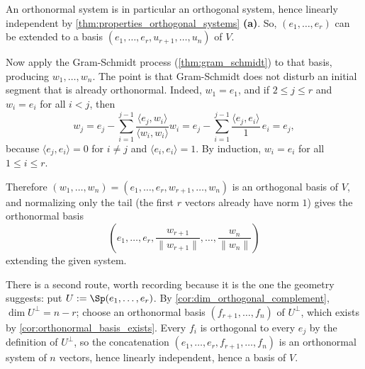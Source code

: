 \begin{exercisesolution}
\label{sol:extend_orthonormal_system}
  An orthonormal system is in particular an orthogonal system, hence linearly independent by \cref{thm:properties_orthogonal_systems} \textbf{(a)}. So, $(e_1, \dots, e_r)$ can be extended to a basis $(e_1, \dots, e_r, u_{r+1}, \dots, u_n)$ of $V$.

  Now apply the Gram-Schmidt process (\cref{thm:gram_schmidt}) to that basis, producing $w_1, \dots, w_n$. The point is that Gram-Schmidt does not disturb an initial segment that is already orthonormal. Indeed, $w_1 = e_1$, and if $2 \le j \le r$ and $w_i = e_i$ for all $i < j$, then
  \[ w_j = e_j - \sum_{i=1}^{j-1} \frac{\langle e_j, w_i \rangle}{\langle w_i, w_i \rangle} w_i = e_j - \sum_{i=1}^{j-1} \frac{\langle e_j, e_i \rangle}{1} \, e_i = e_j, \]
  because $\langle e_j, e_i \rangle = 0$ for $i \ne j$ and $\langle e_i, e_i \rangle = 1$. By induction, $w_i = e_i$ for all $1 \le i \le r$.

  Therefore $(w_1, \dots, w_n) = (e_1, \dots, e_r, w_{r+1}, \dots, w_n)$ is an orthogonal basis of $V$, and normalizing only the tail (the first $r$ vectors already have norm $1$) gives the orthonormal basis
  \[ \left( e_1, \dots, e_r, \frac{w_{r+1}}{\|w_{r+1}\|}, \dots, \frac{w_n}{\|w_n\|} \right) \]
  extending the given system.

  There is a second route, worth recording because it is the one the geometry suggests: put $U := \Sp(e_1, \dots, e_r)$. By \cref{cor:dim_orthogonal_complement}, $\dim U^\perp = n - r$; choose an orthonormal basis $(f_{r+1}, \dots, f_n)$ of $U^\perp$, which exists by \cref{cor:orthonormal_basis_exists}. Every $f_i$ is orthogonal to every $e_j$ by the definition of $U^\perp$, so the concatenation $(e_1, \dots, e_r, f_{r+1}, \dots, f_n)$ is an orthonormal system of $n$ vectors, hence linearly independent, hence a basis of $V$.
\end{exercisesolution}

